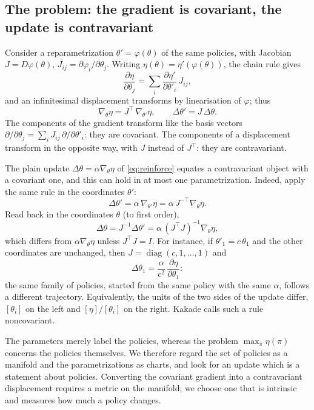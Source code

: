 \documentclass[11pt,a4paper]{article}
\numberwithin{equation}{section}
\theoremstyle{plain}
\theoremstyle{definition}
\theoremstyle{remark}
\newcommand{\T}{^{\top}}
\DeclareMathOperator{\diag}{diag}
\begin{document}
\subsection{The problem: the gradient is covariant, the update is contravariant}\label{sec:problem}

Consider a reparametrization $\theta'=\varphi(\theta)$ of the same policies, with Jacobian
$J=D\varphi(\theta)$, $J_{ij}=\partial\varphi_i/\partial\theta_j$. Writing $\eta(\theta)=\eta'(\varphi(\theta))$, the chain rule gives
\[
  \frac{\partial\eta}{\partial\theta_j}=\sum_i\frac{\partial\eta'}{\partial\theta'_i}\,J_{ij},
\]
and an infinitesimal displacement transforms by linearisation of $\varphi$; thus
\begin{equation}\label{eq:covcontra}
  \nabla_\theta\eta=J\T\,\nabla_{\theta'}\eta,
  \qquad
  \Delta\theta'=J\,\Delta\theta .
\end{equation}
The components of the gradient transform like the basis vectors
$\partial/\partial\theta_j=\sum_iJ_{ij}\,\partial/\partial\theta'_i$: they are covariant. The components of a
displacement transform in the opposite way, with $J$ instead of $J\T$: they are contravariant.

The plain update $\Delta\theta=\alpha\nabla_\theta\eta$ of \eqref{eq:reinforce} equates a contravariant object with a covariant one,
and this can hold in at most one parametrization. Indeed, apply the same rule in the coordinates $\theta'$:
\[
  \Delta\theta'=\alpha\,\nabla_{\theta'}\eta=\alpha\,J^{-\top}\nabla_\theta\eta .
\]
Read back in the coordinates $\theta$ (to first order),
\begin{equation}\label{eq:plain-in-other-chart}
  \Delta\theta=J^{-1}\Delta\theta'=\alpha\,(J\T J)^{-1}\nabla_\theta\eta,
\end{equation}
which differs from $\alpha\nabla_\theta\eta$ unless $J\T J=I$. For instance, if $\theta'_1=c\,\theta_1$ and the other
coordinates are unchanged, then $J=\diag(c,1,\dots,1)$ and
\begin{equation}\label{eq:c2}
  \Delta\theta_1=\frac{\alpha}{c^{2}}\,\frac{\partial\eta}{\partial\theta_1}:
\end{equation}
the same family of policies, started from the same policy with the same $\alpha$, follows a different
trajectory. Equivalently, the units of the two sides of the update differ, $[\theta_i]$ on the left and
$[\eta]/[\theta_i]$ on the right. Kakade \cite{kakade2001} calls such a rule noncovariant.

The parameters merely label the policies, whereas the problem $\max_\pi\eta(\pi)$ concerns the policies themselves.
We therefore regard the set of policies as a manifold and the parametrizations as charts, and look for an update which
is a statement about policies. Converting the covariant gradient into a contravariant displacement requires a
metric on the manifold; we choose one that is intrinsic and measures how much a policy changes.
\end{document}
